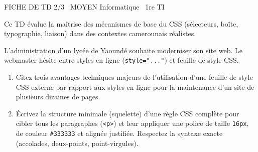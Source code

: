 \documentclass[11pt]{article}
\begin{document}
\begin{tcolorbox}[enhanced,colback=popink,colframe=popink,arc=10pt,boxrule=0pt,left=12pt,right=12pt,top=9pt,bottom=9pt]
{\color{white}\popxbold\small FICHE DE TD 2/3 \textbullet\ MOYEN \hfill Informatique \textbullet\ 1re TI\par}
\end{tcolorbox}
\vspace{4pt}
Ce TD évalue la maîtrise des mécanismes de base du CSS (sélecteurs, boîte, typographie, liaison) dans des contextes camerounais réalistes.

\begin{exercice}
L'administration d'un lycée de Yaoundé souhaite moderniser son site web. Le webmaster hésite entre styles en ligne (\texttt{style="..."}) et feuille de style CSS.
\begin{enumerate}
    \item Citez trois avantages techniques majeurs de l'utilisation d'une feuille de style CSS externe par rapport aux styles en ligne pour la maintenance d'un site de plusieurs dizaines de pages.
    \item Écrivez la structure minimale (squelette) d'une règle CSS complète pour cibler tous les paragraphes (\texttt{<p>}) et leur appliquer une police de taille \texttt{16px}, de couleur \texttt{\#333333} et alignée justifiée. Respectez la syntaxe exacte (accolades, deux-points, point-virgules).
\end{enumerate}
\end{exercice}
\end{document}
